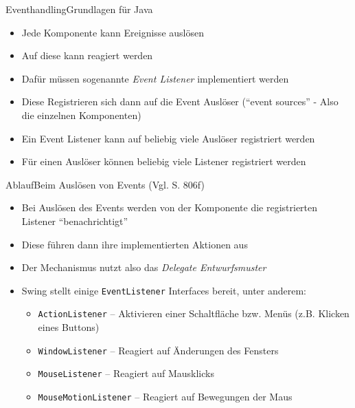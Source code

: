\begin{frame}{Eventhandling}{Grundlagen für Java}
    \begin{itemize} 
        \item Jede Komponente kann Ereignisse auslösen
        \item Auf diese kann reagiert werden
        \item Dafür müssen sogenannte \textit{Event Listener} implementiert werden
        \item Diese Registrieren sich dann auf die Event Auslöser ("`event sources"' - Also die einzelnen Komponenten)
        \item Ein Event Listener kann auf beliebig viele Auslöser registriert werden
        \item Für einen Auslöser können beliebig viele Listener registriert werden
    \end{itemize}
\end{frame}

\begin{frame}{Ablauf}{Beim Auslösen von Events (Vgl. \cite{ullenboom2018java} S. 806f)}
    \begin{itemize}
        \item Bei Auslösen des Events werden von der Komponente die registrierten Listener "`benachrichtigt"'
        \item Diese führen dann ihre implementierten Aktionen aus
        \item Der Mechanismus nutzt also das \textit{Delegate Entwurfsmuster}
        \item Swing stellt einige \texttt{EventListener} Interfaces bereit, unter anderem:
        \begin{itemize}
            \item \texttt{ActionListener} -- Aktivieren einer Schaltfläche bzw. Menüs (z.B. Klicken eines Buttons)
            \item \texttt{WindowListener} -- Reagiert auf Änderungen des Fensters
            \item \texttt{MouseListener} -- Reagiert auf Mausklicks
            \item \texttt{MouseMotionListener} -- Reagiert auf Bewegungen der Maus
        \end{itemize}
    \end{itemize}
\end{frame}

